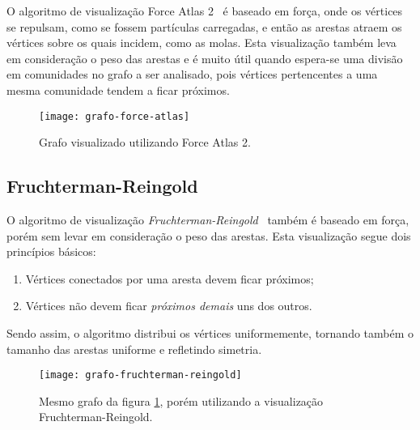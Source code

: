 O algoritmo de visualização Force Atlas 2~\cite{jacomy2014forceatlas2} é baseado em força, onde os vértices se repulsam, como se fossem partículas carregadas, e então as arestas atraem os vértices sobre os quais incidem, como as molas. Esta visualização também leva em consideração o peso das arestas e é muito útil quando espera-se uma divisão em comunidades no grafo a ser analisado, pois vértices pertencentes a uma mesma comunidade tendem a ficar próximos.

\begin{figure}[H]
\texttt{[image: grafo-force-atlas]}
\centering
\caption{
    Grafo visualizado utilizando Force Atlas 2.
}
\label{fig:grafo-force-atlas}
\end{figure}

\subsection{Fruchterman-Reingold}
\label{conceitos__visualizacoes--fruchterman-reingold}

O algoritmo de visualização \emph{Fruchterman-Reingold}~\cite{fruchterman1991graph} também é baseado em força, porém sem levar em consideração o peso das arestas. Esta visualização segue dois princípios básicos:

\begin{enumerate}
\item Vértices conectados por uma aresta devem ficar próximos;
\item Vértices não devem ficar \emph{próximos demais} uns dos outros.
\end{enumerate}

Sendo assim, o algoritmo distribui os vértices uniformemente, tornando também o tamanho das arestas uniforme e refletindo simetria.

\begin{figure}[H]
\texttt{[image: grafo-fruchterman-reingold]}
\centering
\caption{
    Mesmo grafo da figura \ref{fig:grafo-force-atlas}, porém utilizando a visualização Fruchterman-Reingold.
}
\label{fig:grafo-fruchterman-reingold}
\end{figure}
